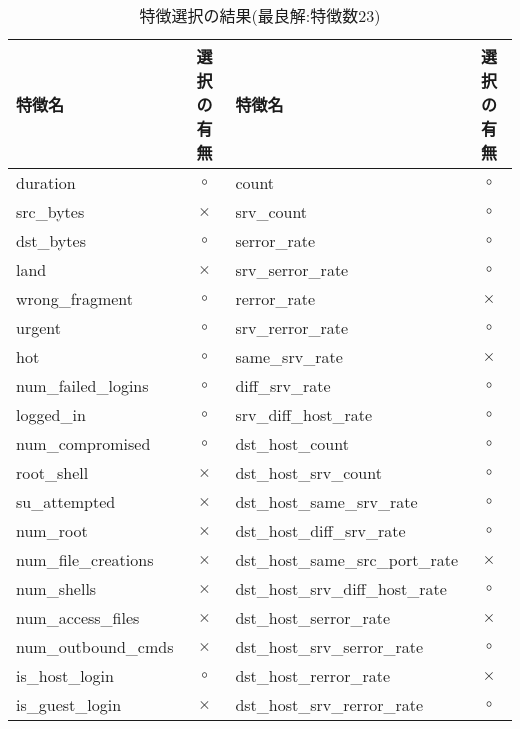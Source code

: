   \begin{table}[htbp]
  \setlength{\tabcolsep}{2pt} %
  \renewcommand{\arraystretch}{0.8} %
  \centering
  \caption{特徴選択の結果(最良解:特徴数23)}
  \begin{tabular}{|l|c|l|c|}
    \hline
    特徴名 & 選択の有無 & 特徴名 & 選択の有無   \\
    \hline
    duration & \(\circ\) & count & \(\circ\)  \\
    \hline
    src\_bytes &  \(\times\) & srv\_count & \(\circ\)   \\
    \hline
    dst\_bytes & \(\circ\) & serror\_rate & \(\circ\)   \\
    \cline{1-4}
    land & \(\times\) & srv\_serror\_rate & \(\circ\)   \\
    \cline{1-4}
    wrong\_fragment & \(\circ\) & rerror\_rate & \(\times\)   \\
    \cline{1-4}
    urgent & \(\circ\) & srv\_rerror\_rate & \(\circ\)   \\
    \cline{1-4}
    hot & \(\circ\) & same\_srv\_rate & \(\times\)   \\
    \cline{1-4}
    num\_failed\_logins & \(\circ\) & diff\_srv\_rate &  \(\circ\)  \\
    \cline{1-4}
    logged\_in & \(\circ\) & srv\_diff\_host\_rate &  \(\circ\)   \\
    \cline{1-4}
    num\_compromised & \(\circ\) & dst\_host\_count &\(\circ\)   \\
    \cline{1-4}
    root\_shell &\(\times\) & dst\_host\_srv\_count &\(\circ\)   \\
    \cline{1-4}
    su\_attempted &\(\times\) & dst\_host\_same\_srv\_rate & \(\circ\)   \\
    \cline{1-4}
    num\_root & \(\times\) & dst\_host\_diff\_srv\_rate &  \(\circ\)  \\
    \cline{1-4}
    num\_file\_creations &  \(\times\) & dst\_host\_same\_src\_port\_rate &   \(\times\)   \\
    \cline{1-4}
    num\_shells &  \(\times\) & dst\_host\_srv\_diff\_host\_rate & \(\circ\)  \\
    \cline{1-4}
    num\_access\_files &  \(\times\) & dst\_host\_serror\_rate & \(\times\)    \\
    \cline{1-4}
    num\_outbound\_cmds & \(\times\) & dst\_host\_srv\_serror\_rate & \(\circ\)   \\
    \cline{1-4}
    is\_host\_login & \(\circ\) &  dst\_host\_rerror\_rate & \(\times\)    \\
    \cline{1-4}
    is\_guest\_login & \(\times\) & dst\_host\_srv\_rerror\_rate & \(\circ\)  \\
    \cline{1-4}
\end{tabular}
\end{table}
